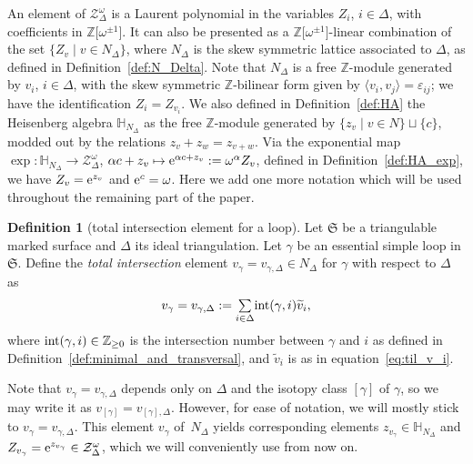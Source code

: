 \documentclass[10pt,a4paper]{amsart}
\numberwithin{equation}{section}
\theoremstyle{definition}
\newtheorem{Definition}[Theorem]{Definition}
\newcommand{\til}[1]{\widetilde{#1}}
\begin{document}
An element of $\mathcal{Z}^\omega_\Delta$ is a Laurent polynomial in the variables $Z_i$, $i\in \Delta$, with coefficients in $\mathbb{Z}\bigl[\omega^{\pm 1}\bigr]$. It can also be presented as a $\mathbb{Z}\bigl[\omega^{\pm 1}\bigr]$-linear combination of the set $\{Z_v \mid v\in N_\Delta\}$, where $N_\Delta$ is the skew symmetric lattice associated to $\Delta$, as defined in Definition~\ref{def:N_Delta}. Note that $N_\Delta$ is a free $\mathbb{Z}$-module generated by $v_i$, $i\in \Delta$, with the skew symmetric $\mathbb{Z}$-bilinear form given by $\langle v_i,v_j\rangle = \varepsilon_{ij}$; we have the identification $Z_i = Z_{v_i}$. We also defined in Definition~\ref{def:HA} the Heisenberg algebra $\mathbb{H}_{N_\Delta}$ as the free $\mathbb{Z}$-module generated by $\{z_v \mid v\in N\} \sqcup\{c\}$, modded out by the relations $z_v + z_w = z_{v+w}$. Via the exponential map $\exp \colon \mathbb{H}_{N_\Delta} \to \mathcal{Z}^\omega_\Delta$, $\alpha c + z_v \mapsto {\rm e}^{\alpha c + z_v} := \omega^\alpha Z_v$, defined in Definition~\ref{def:HA_exp}, we have $Z_v = {\rm e}^{z_v}$ and ${\rm e}^c = \omega$.
Here we add one more notation which will be used throughout the remaining part of the paper.
\begin{Definition}[total intersection element for a loop]
\label{def:v_gamma}
Let $\mathfrak{S}$ be a triangulable marked surface and $\Delta$ its ideal triangulation. Let $\gamma$ be an essential simple loop in $\mathfrak{S}$. Define the {\em total intersection} element $v_\gamma = v_{\gamma,\Delta} \in N_\Delta$ for $\gamma$ with respect to $\Delta$ as
\[
v_\gamma = v_{\gamma,\Delta} := \underset{i\in \Delta}{\textstyle \sum} {\rm int}(\gamma,i) \til{v}_i,
\]
where ${\rm int}(\gamma,i) \in \mathbb{Z}_{\ge 0}$ is the intersection number between $\gamma$ and $i$ as defined in Definition~\ref{def:minimal_and_transversal}, and $\til{v}_i$ is as in equation~\eqref{eq:til_v_i}.
\end{Definition}
Note that $v_\gamma = v_{\gamma,\Delta}$ depends only on $\Delta$ and the isotopy class $[\gamma]$ of $\gamma$, so we may write it as $v_{[\gamma]} = v_{[\gamma],\Delta}$. However, for ease of notation, we will mostly stick to $v_\gamma = v_{\gamma,\Delta}$. This element $v_\gamma$ of~$N_\Delta$ yields corresponding elements $z_{v_\gamma} \in \mathbb{H}_{N_\Delta}$ and $Z_{v_\gamma} = {\rm e}^{z_{v_\gamma}} \in \mathcal{Z}^\omega_\Delta$, which we will conveniently use from now on.
\end{document}
